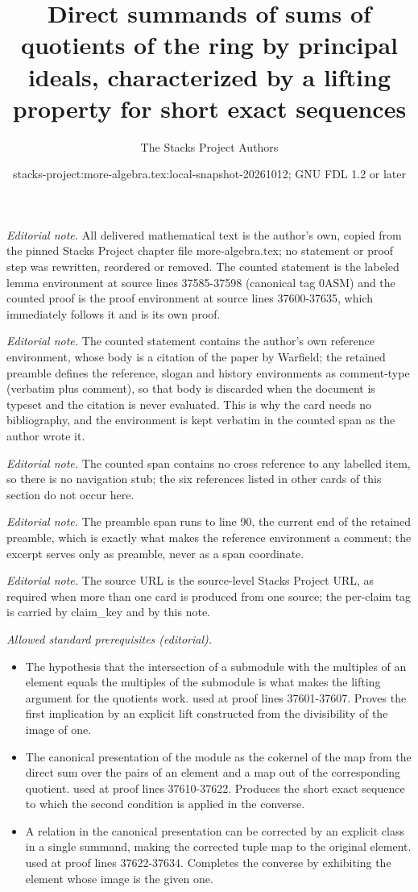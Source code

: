 \documentclass[10pt,a4paper]{amsart}
\title{Direct summands of sums of quotients of the ring by principal ideals, characterized by a lifting property for short exact sequences}
\author{The Stacks Project Authors}
\date{stacks-project:more-algebra.tex:local-snapshot-20261012; GNU FDL 1.2 or later}
\theoremstyle{plain}
\theoremstyle{definition}
\theoremstyle{remark}
\numberwithin{equation}{subsection}
\begin{document}
\maketitle
\setcounter{subsection}{1}
\noindent\textit{Editorial note.} All delivered mathematical text is the author's own, copied from the pinned Stacks Project chapter file more-algebra.tex; no statement or proof step was rewritten, reordered or removed. The counted statement is the labeled lemma environment at source lines 37585-37598 (canonical tag 0ASM) and the counted proof is the proof environment at source lines 37600-37635, which immediately follows it and is its own proof.\par\medskip
\noindent\textit{Editorial note.} The counted statement contains the author's own reference environment, whose body is a citation of the paper by Warfield; the retained preamble defines the reference, slogan and history environments as comment-type (verbatim plus comment), so that body is discarded when the document is typeset and the citation is never evaluated. This is why the card needs no bibliography, and the environment is kept verbatim in the counted span as the author wrote it.\par\medskip
\noindent\textit{Editorial note.} The counted span contains no cross reference to any labelled item, so there is no navigation stub; the six references listed in other cards of this section do not occur here.\par\medskip
\noindent\textit{Editorial note.} The preamble span runs to line 90, the current end of the retained preamble, which is exactly what makes the reference environment a comment; the excerpt serves only as preamble, never as a span coordinate.\par\medskip
\noindent\textit{Editorial note.} The source URL is the source-level Stacks Project URL, as required when more than one card is produced from one source; the per-claim tag is carried by claim\_key and by this note.\par\medskip
\noindent\textit{Allowed standard prerequisites (editorial).}\begin{itemize}
\item The hypothesis that the intersection of a submodule with the multiples of an element equals the multiples of the submodule is what makes the lifting argument for the quotients work. used at proof lines 37601-37607. Proves the first implication by an explicit lift constructed from the divisibility of the image of one.
\item The canonical presentation of the module as the cokernel of the map from the direct sum over the pairs of an element and a map out of the corresponding quotient. used at proof lines 37610-37622. Produces the short exact sequence to which the second condition is applied in the converse.
\item A relation in the canonical presentation can be corrected by an explicit class in a single summand, making the corrected tuple map to the original element. used at proof lines 37622-37634. Completes the converse by exhibiting the element whose image is the given one.
\end{itemize}\medskip
\end{document}
